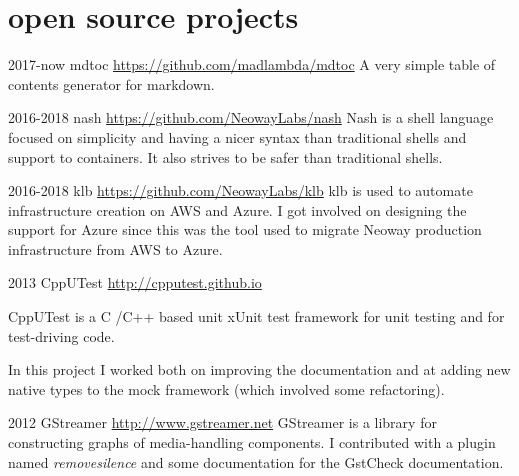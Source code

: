 \documentclass[]{friggeri-cv} %
\begin{document}
\pagebreak
\section{open source projects}

\begin{entrylist}
\entry
{2017-now}
{mdtoc}
{\href{https://github.com/madlambda/mdtoc}{https://github.com/madlambda/mdtoc}}
{
A very simple table of contents generator for markdown.
}
\end{entrylist}

\begin{entrylist}
\entry
{2016-2018}
{nash}
{\href{https://github.com/NeowayLabs/nash}{https://github.com/NeowayLabs/nash}}
{
Nash is a shell language focused on simplicity and having a nicer syntax
than traditional shells and support to containers. It also strives to be
safer than traditional shells.
}
\end{entrylist}

\begin{entrylist}
\entry
{2016-2018}
{klb}
{\href{https://github.com/NeowayLabs/klb}{https://github.com/NeowayLabs/klb}}
{
klb is used to automate infrastructure creation on AWS and Azure.
I got involved on designing the support for Azure since this was
the tool used to migrate Neoway production infrastructure from
AWS to Azure.
}
\end{entrylist}

\begin{entrylist}
\entry
{2013}
{CppUTest}
{\href{http://cpputest.github.io}{http://cpputest.github.io}}
{
CppUTest is a C /C++ based unit xUnit test framework for unit
testing and for test-driving code.

In this project I worked both on improving the documentation and
at adding new native types to the mock framework (which involved
some refactoring).
}
\end{entrylist}

\begin{entrylist}
\entry
{2012}
{GStreamer}
{\href{http://www.gstreamer.net}{http://www.gstreamer.net}}
{
GStreamer is a library for constructing graphs of
media-handling components. I contributed with a plugin
named \emph{removesilence} and some documentation for the
GstCheck documentation.
}
\end{entrylist}
\end{document}
